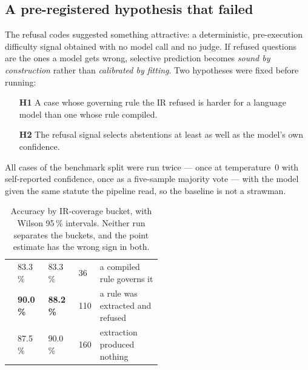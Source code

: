 \documentclass[11pt]{article}
\begin{document}
\subsection{A pre-registered hypothesis that failed}

The refusal codes suggested something attractive: a deterministic,
pre-execution difficulty signal obtained with no model call and no judge.
If refused questions are the ones a model gets wrong, selective prediction
becomes \emph{sound by construction} rather than \emph{calibrated by
fitting}. Two hypotheses were fixed before running:

\begin{itemize}
  \item[\textbf{H1}] A case whose governing rule the IR refused is harder
    for a language model than one whose rule compiled.
  \item[\textbf{H2}] The refusal signal selects abstentions at least as
    well as the model's own confidence.
\end{itemize}

All \rcN{} cases of the benchmark split were run twice --- once at
temperature~0 with self-reported confidence, once as a five-sample majority
vote --- with the model given the same statute the pipeline read, so the
baseline is not a strawman.

\begin{table}[htbp]
\centering
\caption{Accuracy by IR-coverage bucket, with Wilson 95\,\% intervals.
  Neither run separates the buckets, and the point estimate has the wrong
  sign in both.}
\label{tab:buckets}
{\small
\begin{tabularx}{\linewidth}{@{}l C{0.20\linewidth} C{0.20\linewidth} C{0.10\linewidth} X@{}}
\toprule
{} &  &  &  &  \\
\midrule
{} & 83.3\,\% \newline {\scriptsize [68.1, 92.1]} & 83.3\,\% & 36
  & a compiled rule governs it \\
 & \textbf{90.0\,\%} \newline {\scriptsize [83.0, 94.3]} & \textbf{88.2\,\%} & 110
  & a rule was extracted and refused \\
 & 87.5\,\% \newline {\scriptsize [81.5, 91.8]} & 90.0\,\% & 160
  & extraction produced nothing \\
\bottomrule
\end{tabularx}}
\end{table}
\end{document}
